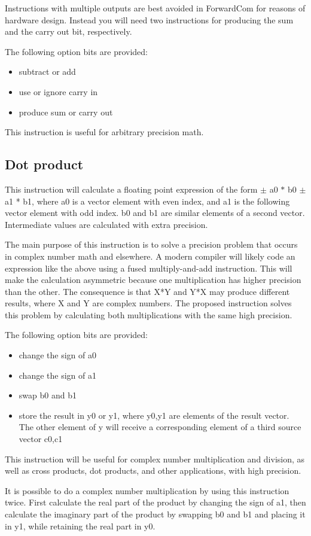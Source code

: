 \documentclass[forwardcom.tex]{subfiles}
\begin{document}
Instructions with multiple outputs are best avoided in ForwardCom for reasons of hardware design. Instead you will need two instructions for producing the sum and the carry out bit, respectively. 
\vv

The following option bits are provided:
\begin{itemize}
\item subtract or add
\item use or ignore carry in
\item produce sum or carry out
\end{itemize}
\vv

This instruction is useful for arbitrary precision math.
\vv

\subsection{Dot product}
This instruction will calculate a floating point expression of the form $\pm$ a0 $*$ b0 $\pm$ a1 * b1, where a0 is a vector element with even index, and a1 is the following vector element with odd index. b0 and b1 are similar elements of a second vector. Intermediate values are calculated with extra precision.
\vv

The main purpose of this instruction is to solve a precision problem that occurs in complex number math and elsewhere. A modern compiler will likely code an expression like the above using a fused multiply-and-add instruction. This will make the calculation asymmetric because one multiplication has higher precision than the other. The consequence is that X*Y and Y*X may produce different results, where X and Y are complex numbers. The proposed instruction solves this problem by calculating both multiplications with the same high precision.
\vv

The following option bits are provided:
\begin{itemize}
\item change the sign of a0
\item change the sign of a1
\item swap b0 and b1
\item store the result in y0 or y1, where y0,y1 are elements of the result vector. The other element of y will receive a corresponding element of a third source vector c0,c1
\end{itemize}
\vv

This instruction will be useful for complex number multiplication and division, as well as cross products, dot products, and other applications, with high precision.
\vv

It is possible to do a complex number multiplication by using this instruction twice. First calculate the real part of the product by changing the sign of a1, then calculate the imaginary part of the product by swapping b0 and b1 and placing it in y1, while retaining the real part in y0.
\vv

 
\end{document}
